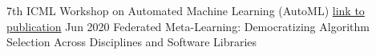 \begin{cvhonors}
  \cvhonor
    {7th ICML Workshop on Automated Machine Learning (AutoML)}
    {\empty}
    {\href{https://www.automl.org/wp-content/uploads/2020/07/AutoML_2020_paper_39.pdf}{link to publication}}
    {Jun 2020}
  \cvhon
    {\empty}
    {Federated Meta-Learning: Democratizing Algorithm Selection Across Disciplines and Software Libraries}
    {\empty}
    {\empty}
\end{cvhonors}


